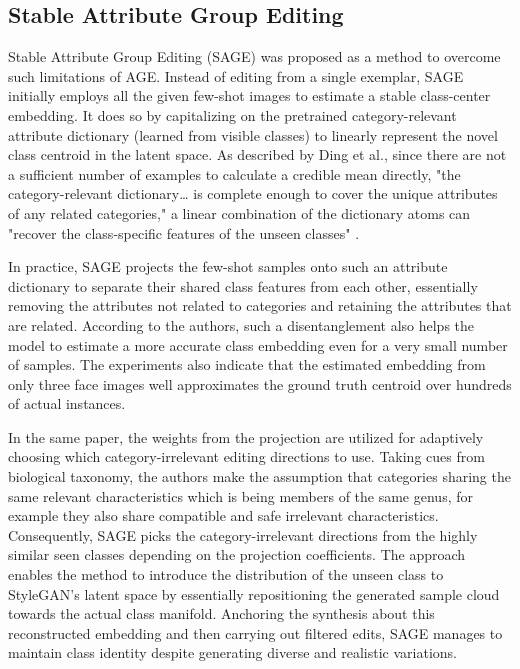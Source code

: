 \subsection{Stable Attribute Group Editing}

Stable Attribute Group Editing (SAGE) was proposed as a method to overcome such limitations of AGE. Instead of editing 
from a single exemplar, SAGE initially employs all the given few-shot images to estimate a stable class-center embedding. 
It does so by capitalizing on the pretrained category-relevant attribute dictionary (learned from visible classes) to 
linearly represent the novel class centroid in the latent space. As described by Ding et al., since there are not a sufficient
 number of examples to calculate a credible mean directly, "the category-relevant dictionary… is complete enough to cover 
 the unique attributes of any related categories," a linear combination of the dictionary atoms can "recover the class-specific 
 features of the unseen classes" \citep{ding2023stableattributegroupediting}.

In practice, SAGE projects the few-shot samples onto such an attribute dictionary to separate their shared class features 
from each other, essentially removing the attributes not related to categories and retaining the attributes that are related. 
According to the authors, such a disentanglement also helps the model to estimate a more accurate class embedding even for a very small number of samples. The experiments also indicate that the estimated embedding from only three face images well approximates the ground truth centroid over hundreds of actual instances.

In the same paper, the weights from the projection are utilized for adaptively choosing which category-irrelevant editing 
directions to use. Taking cues from biological taxonomy, the authors make the assumption that categories sharing the same 
relevant characteristics which is being members of the same genus, for example they also share compatible and safe irrelevant 
characteristics. Consequently, SAGE picks the category-irrelevant directions from the highly similar seen classes depending on 
the projection coefficients. The approach enables the method to introduce the distribution of the unseen class to StyleGAN’s 
latent space by essentially repositioning the generated sample cloud towards the actual class manifold. Anchoring the synthesis 
about this reconstructed embedding and then carrying out filtered edits, SAGE manages to maintain class identity despite 
generating diverse and realistic variations.

